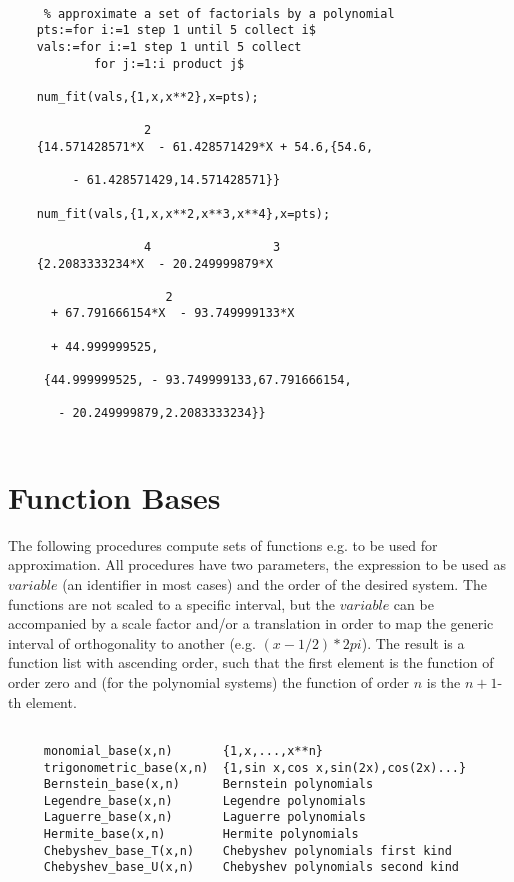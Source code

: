 \begin{verbatim}

     % approximate a set of factorials by a polynomial
    pts:=for i:=1 step 1 until 5 collect i$
    vals:=for i:=1 step 1 until 5 collect
            for j:=1:i product j$

    num_fit(vals,{1,x,x**2},x=pts);

                   2
    {14.571428571*X  - 61.428571429*X + 54.6,{54.6,

         - 61.428571429,14.571428571}}

    num_fit(vals,{1,x,x**2,x**3,x**4},x=pts);

                   4                 3
    {2.2083333234*X  - 20.249999879*X

                      2
      + 67.791666154*X  - 93.749999133*X

      + 44.999999525,

     {44.999999525, - 93.749999133,67.791666154,

       - 20.249999879,2.2083333234}}


\end{verbatim}

\section{Function Bases}

The following procedures compute sets of functions
e.g. to be used for approximation.
All procedures have
two parameters, the expression to be used as $variable$
(an identifier in most cases) and the
order of the desired system.
The functions are not scaled to a specific interval, but
the $variable$ can be accompanied by a scale factor
and/or a translation
in order to map the generic interval of orthogonality to another
(e.g. $(x- 1/2 ) * 2 pi$).
The result is a function list with ascending order, such that
the first element is the function of order zero and (for
the polynomial systems) the function of order $n$ is the $n+1$-th
element.

\begin{verbatim}

     monomial_base(x,n)       {1,x,...,x**n}
     trigonometric_base(x,n)  {1,sin x,cos x,sin(2x),cos(2x)...}
     Bernstein_base(x,n)      Bernstein polynomials
     Legendre_base(x,n)       Legendre polynomials
     Laguerre_base(x,n)       Laguerre polynomials
     Hermite_base(x,n)        Hermite polynomials
     Chebyshev_base_T(x,n)    Chebyshev polynomials first kind
     Chebyshev_base_U(x,n)    Chebyshev polynomials second kind

\end{verbatim}

